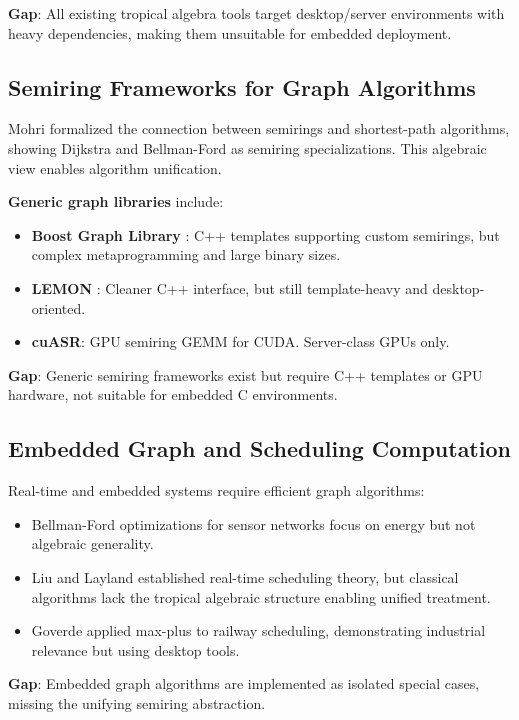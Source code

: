\documentclass[11pt,a4paper]{article}
\theoremstyle{plain}
\theoremstyle{definition}
\begin{document}
\textbf{Gap}: All existing tropical algebra tools target desktop/server environments with heavy dependencies, making them unsuitable for embedded deployment.

\subsection{Semiring Frameworks for Graph Algorithms}

Mohri \cite{mohri2002semiring} formalized the connection between semirings and shortest-path algorithms, showing Dijkstra and Bellman-Ford as semiring specializations. This algebraic view enables algorithm unification.

\textbf{Generic graph libraries} include:
\begin{itemize}
    \item \textbf{Boost Graph Library} \cite{siek2002boost}: C++ templates supporting custom semirings, but complex metaprogramming and large binary sizes.
    \item \textbf{LEMON} \cite{dezso2011lemon}: Cleaner C++ interface, but still template-heavy and desktop-oriented.
    \item \textbf{cuASR}: GPU semiring GEMM for CUDA. Server-class GPUs only.
\end{itemize}

\textbf{Gap}: Generic semiring frameworks exist but require C++ templates or GPU hardware, not suitable for embedded C environments.

\subsection{Embedded Graph and Scheduling Computation}

Real-time and embedded systems require efficient graph algorithms:
\begin{itemize}
    \item Bellman-Ford optimizations for sensor networks \cite{ding2020energy} focus on energy but not algebraic generality.
    \item Liu and Layland \cite{liu1973scheduling} established real-time scheduling theory, but classical algorithms lack the tropical algebraic structure enabling unified treatment.
    \item Goverde \cite{goverde2007railway} applied max-plus to railway scheduling, demonstrating industrial relevance but using desktop tools.
\end{itemize}

\textbf{Gap}: Embedded graph algorithms are implemented as isolated special cases, missing the unifying semiring abstraction.
\end{document}
